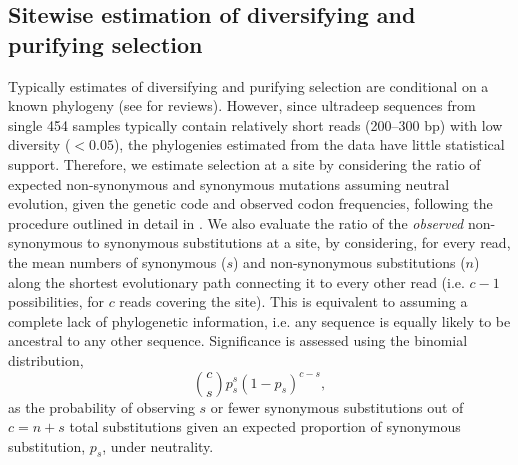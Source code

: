\documentclass[10pt]{article}
\begin{document}
\subsection*{Sitewise estimation of diversifying and purifying selection}
Typically estimates of diversifying and purifying selection are conditional on a known phylogeny (see \cite{Delport2009,Anisimova2009} for reviews).
However, since ultradeep sequences from single 454 samples typically contain relatively short reads (200--300 bp) with low diversity ($<0.05$),
the phylogenies estimated from the data have little statistical support.
Therefore, we estimate selection at a site by considering the ratio of expected non-synonymous and synonymous mutations assuming neutral evolution,
given the genetic code and observed codon frequencies, following the procedure outlined in detail in \cite{KosakovskyPond2005b}.
We also evaluate the ratio of the \textit{observed} non-synonymous to synonymous substitutions at a site, by considering, for every read,
the mean numbers of synonymous ($s$) and non-synonymous substitutions ($n$)
along the shortest evolutionary path connecting it to every other read (i.e. $c-1$ possibilities, for $c$ reads covering the site).
This is equivalent to assuming a complete lack of phylogenetic information,
i.e. any sequence is equally likely to be ancestral to any other sequence.
Significance is assessed using the binomial distribution, \[ \binom{c}{s}p_{s}^{s}(1-p_{s})^{c-s}, \]
as the probability of observing $s$ or fewer synonymous substitutions out of $c=n+s$ total substitutions
given an expected proportion of synonymous substitution, $p_{s}$, under neutrality.
\end{document}
